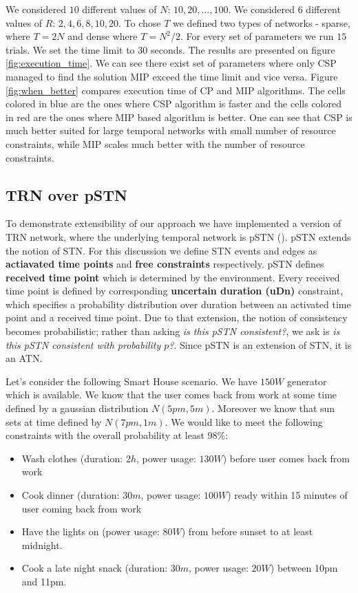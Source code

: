 We considered $10$ different values of $N$: $10, 20, ..., 100$. We considered $6$ different values of $R$: $2, 4, 6, 8, 10, 20$. To chose $T$ we defined two types of networks - sparse, where $T = 2N$ and dense where $T = N^2/2$. For every set of parameters we run $15$ trials. We set the time limit to $30$ seconds. The results are presented on figure \ref{fig:execution_time}. We can see there exist set of parameters where only CSP managed to find the solution MIP exceed the time limit and vice versa. Figure \ref{fig:when_better} compares execution time of CP and MIP algorithms. The cells colored in blue are the ones where CSP algorithm is faster and the cells colored in red are the ones where MIP based algorithm is better. One can see that CSP is much better suited for large temporal networks with small number of resource constraints, while MIP scales much better with the number of resource constraints.




\subsection{TRN over pSTN}
To demonstrate extensibility of our approach we have implemented a version of TRN network, where the underlying temporal network is pSTN (\cite{Fang2014}). pSTN extends the notion of STN. For this discussion we define STN events and edges as \textbf{actiavated time points} and \textbf{free constraints} respectively. pSTN defines \textbf{received time point} which is determined by the environment. Every received time point is defined by corresponding \textbf{uncertain duration (uDn)} constraint, which specifies a probability distribution over duration between an activated time point and a received time point. Due to that extension, the notion of consistency becomes probabilistic; rather than asking \textit{is this pSTN consistent?}, we ask is \textit{is this pSTN consistent with probability $p$?}. Since pSTN is an extension of STN, it is an ATN.

Let's consider the following Smart House scenario. We have $150W$ generator which is available. We know that the user comes back from work at some time defined by a gaussian distribution $N(5pm, 5m)$. Moreover we know that sun sets at time defined by $N(7pm, 1m)$. We would like to meet the following constraints with the overall probability at least $98\%$:
\begin{itemize}
\item Wash clothes (duration: $2h$, power usage: $130W$) before user comes back from work
\item Cook dinner (duration: $30m$, power usage: $100W$) ready within 15 minutes of user coming back from work
\item Have the lights on (power usage: $80W$) from before sunset to at least midnight.
\item Cook a late night snack (duration: $30m$, power usage: $20W$) between 10pm and 11pm.
\end{itemize}


